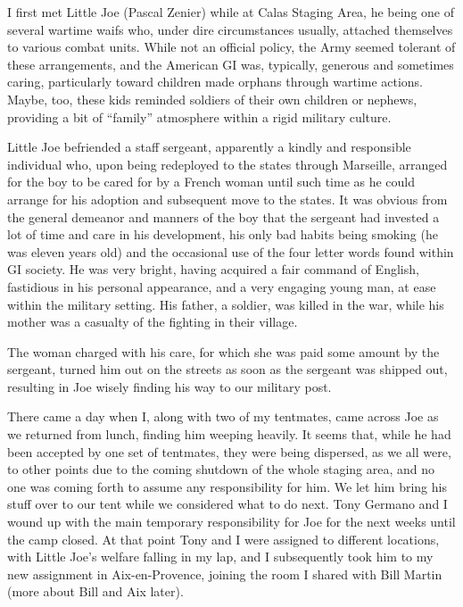 \documentclass[../m3y]{subfiles}
\begin{document}
I first met Little Joe (Pascal Zenier) while at Calas Staging Area, he being one of several wartime waifs who, under dire circumstances usually, attached themselves to various combat units. While not an official policy, the Army seemed tolerant of these arrangements, and the American GI was, typically, generous and sometimes caring, particularly toward children made orphans through wartime actions. Maybe, too, these kids reminded soldiers of their own children or nephews, providing a bit of ``family'' atmosphere within a rigid military culture.

Little Joe befriended a staff sergeant, apparently a kindly and responsible individual who, upon being redeployed to the states through Marseille, arranged for the boy to be cared for by a French woman until such time as he could arrange for his adoption and subsequent move to the states. It was obvious from the general demeanor and manners of the boy that the sergeant had invested a lot of time and care in his development, his only bad habits being smoking (he was eleven years old) and the occasional use of the four letter words found within GI society. He was very bright, having acquired a fair command of English, fastidious in his personal appearance, and a very engaging young man, at ease within the military setting. His father, a soldier, was killed in the war, while his mother was a casualty of the fighting in their village.

The woman charged with his care, for which she was paid some amount by the sergeant, turned him out on the streets as soon as the sergeant was shipped out, resulting in Joe wisely finding his way to our military post.

There came a day when I, along with two of my tentmates, came across Joe as we returned from lunch, finding him weeping heavily. It seems that, while he had been accepted by one set of tentmates, they were being dispersed, as we all were, to other points due to the coming shutdown of the whole staging area, and no one was coming forth to assume any responsibility for him. We let him bring his stuff over to our tent while we considered  what to do next. Tony Germano and I wound up with the main temporary responsibility for Joe for the next weeks until the camp closed. At that point Tony and I were assigned to different locations, with Little Joe's welfare falling in my lap, and I subsequently took him to my new assignment in Aix-en-Provence, joining the room I shared with Bill Martin (more about Bill and Aix later).
\end{document}
